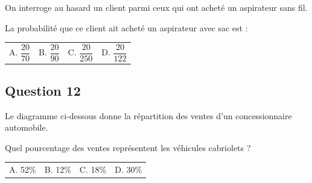 On interroge au hasard un client parmi ceux qui ont acheté un aspirateur sans fil.\par
La probabilité que ce client ait acheté un aspirateur avec sac est :
\begin{center}
\begin{tabularx}{.92\linewidth}{XXXX} A. $\dfrac{20}{70}$ & B. $\dfrac{20}{90}$ & C. $\dfrac{20}{250}$ & D. $\dfrac{20}{122}$\end{tabularx}
\end{center}


\subsection*{Question 12}

Le diagramme ci-dessous donne la répartition des ventes d'un concessionnaire automobile.
\begin{center}
\end{center}

Quel pourcentage des ventes représentent les véhicules cabriolets ?
\begin{center}
\begin{tabularx}{.92\linewidth}{XXXX} A. 52\% & B. 12\% & C. 18\% & D. 30\%\end{tabularx}
\end{center}

\vspace{1em}
